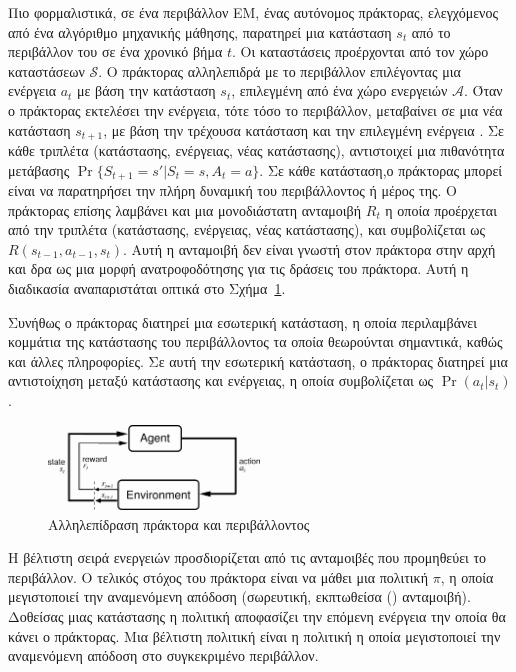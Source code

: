 Πιο φορμαλιστικά, σε ένα περιβάλλον ΕΜ, ένας αυτόνομος πράκτορας, ελεγχόμενος από ένα αλγόριθμο μηχανικής μάθησης,
παρατηρεί μια κατάσταση $s_t$ από το περιβάλλον του σε ένα χρονικό βήμα $t$. Οι καταστάσεις προέρχονται από τον
χώρο καταστάσεων $\mathcal{S}$. Ο πράκτορας αλληλεπιδρά με το περιβάλλον επιλέγοντας μια ενέργεια $a_t$ με βάση την κατάσταση
$s_t$, επιλεγμένη από ένα χώρο ενεργειών $\mathcal{A}$. Όταν ο πράκτορας εκτελέσει την ενέργεια, τότε τόσο το περιβάλλον,
μεταβαίνει σε μια νέα κατάσταση $s_{t+1}$, με βάση την τρέχουσα κατάσταση και την επιλεγμένη
ενέργεια \cite{drlbs}. Σε κάθε τριπλέτα (κατάστασης, ενέργειας, νέας κατάστασης), αντιστοιχεί μια πιθανότητα μετάβασης
$\Pr{\{S_{t+1}=s'|S_t=s, A_{t}=a\}}$. Σε κάθε κατάσταση,ο πράκτορας μπορεί είναι να παρατηρήσει την πλήρη δυναμική του
περιβάλλοντος ή μέρος της. Ο πράκτορας επίσης λαμβάνει και μια μονοδιάστατη ανταμοιβή $R_t$
η οποία προέρχεται από την τριπλέτα (κατάστασης, ενέργειας, νέας κατάστασης), και συμβολίζεται ως
$R(s_{t-1}, a_{t-1}, s_t)$. Αυτή η ανταμοιβή δεν είναι γνωστή στον πράκτορα στην αρχή και
δρα ως μια μορφή ανατροφοδότησης για τις δράσεις του πράκτορα.
Αυτή η διαδικασία αναπαριστάται οπτικά στο Σχήμα~\ref{fig:agent_environment}.


Συνήθως ο πράκτορας διατηρεί μια εσωτερική κατάσταση, η οποία περιλαμβάνει κομμάτια της κατάστασης του περιβάλλοντος τα οποία θεωρούνται
σημαντικά, καθώς και άλλες πληροφορίες. Σε αυτή την εσωτερική κατάσταση, ο πράκτορας
διατηρεί μια αντιστοίχηση μεταξύ κατάστασης και ενέργειας, η οποία συμβολίζεται ως $\Pr(a_t | s_t)$.

\begin{figure}[h]
    \includegraphics[width=0.5\textwidth]{body_matter/reinforcement_learning/images/agent_environment.png}
    \Centering
    \caption{Αλληλεπίδραση πράκτορα και περιβάλλοντος}
    \label{fig:agent_environment}
\end{figure}


Η βέλτιστη σειρά ενεργειών προσδιορίζεται από τις ανταμοιβές που προμηθεύει το περιβάλλον. Ο τελικός στόχος του πράκτορα είναι να μάθει μια
πολιτική $π$, η οποία μεγιστοποιεί την αναμενόμενη απόδοση (σωρευτική, εκπτωθείσα () ανταμοιβή). Δοθείσας μιας κατάστασης
η πολιτική αποφασίζει την επόμενη ενέργεια την οποία θα κάνει ο πράκτορας. Μια βέλτιστη πολιτική είναι η πολιτική η οποία μεγιστοποιεί
την αναμενόμενη απόδοση στο συγκεκριμένο περιβάλλον.

